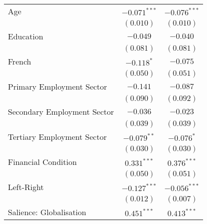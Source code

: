 \begin{center}
\begin{tiny}
\begin{longtable}{l@{} c@{} c@{}}
\quad Age                                                                & $-0.071^{***}$   & $-0.076^{***}$   \\
                                                                         & $(0.010)$        & $(0.010)$        \\
\quad Education                                                          & $-0.049$         & $-0.040$         \\
                                                                         & $(0.081)$        & $(0.081)$        \\
\quad French                                                             & $-0.118^{*}$     & $-0.075$         \\
                                                                         & $(0.050)$        & $(0.051)$        \\
\quad Primary Employment Sector                                          & $-0.141$         & $-0.087$         \\
                                                                         & $(0.090)$        & $(0.092)$        \\
\quad Secondary Employment Sector                                        & $-0.036$         & $-0.023$         \\
                                                                         & $(0.039)$        & $(0.039)$        \\
\quad Tertiary Employment Sector                                         & $-0.079^{**}$    & $-0.076^{*}$     \\
                                                                         & $(0.030)$        & $(0.030)$        \\
\quad Financial Condition                                                & $0.331^{***}$    & $0.376^{***}$    \\
                                                                         & $(0.050)$        & $(0.051)$        \\
\quad Left-Right                                                         & $-0.127^{***}$   & $-0.056^{***}$   \\
                                                                         & $(0.012)$        & $(0.007)$        \\
\quad Salience: Globalisation                                            & $0.451^{***}$    & $0.413^{***}$    \\

\end{longtable}
\end{tiny}
\end{center}
